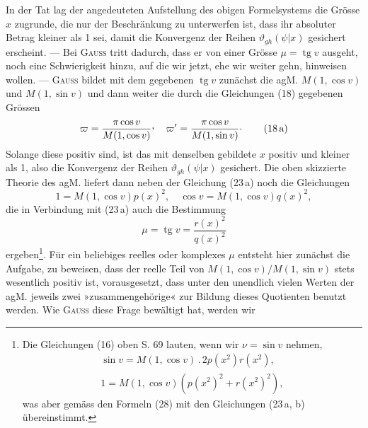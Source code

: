 In der Tat lag der angedeuteten Aufstellung des obigen Formelsystems
die Grösse \(x\) zugrunde, die nur der Beschränkung zu unterwerfen ist, dass
ihr absoluter Betrag kleiner als 1 sei, damit die Konvergenz der Reihen
\(\vartheta_{gh}(\psi|x)\) gesichert erscheint. — Bei \textsc{Gauss} tritt dadurch, dass er von einer
Grösse \(\mu=\operatorname{tg}v\) ausgeht, noch eine Schwierigkeit hinzu, auf die wir jetzt,
ehe wir weiter gehn, hinweisen wollen. — \textsc{Gauss} bildet mit dem gegebenen
\(\operatorname{tg}v\) zunächst die agM. \(M(1,\cos v)\) und \(M(1,\sin v)\) und dann weiter die durch
die Gleichungen (18) gegebenen Grössen
\begingroup\makeatletter\tagsleft@true\let\veqno\leqno\makeatother
\begin{equation*}
\varpi=\frac{\pi\cos v}{M(1,\cos v)}\mathpunct{\vcenter{\hbox{,}}}\quad
\varpi'=\frac{\pi\cos v}{M(1,\sin v)}\mathpunct{\vcenter{\hbox{.}}}\tag{18\,a}
\end{equation*}
\endgroup
\noindent Solange diese positiv sind, ist das mit denselben gebildete \(x\) positiv und kleiner
als 1, also die Konvergenz der Reihen \(\vartheta_{gh}(\psi|x)\) gesichert. Die oben skizzierte
Theorie des agM. liefert dann neben der Gleichung (23\,a) noch die Gleichungen
\begingroup\makeatletter\tagsleft@true\let\veqno\leqno\makeatother
\begin{equation*}
1=M(1,\cos v)p(x)^2,\quad\cos v=M(1,\cos v)q(x)^2,\tag{23\,b}
\end{equation*}
\endgroup
\noindent die in Verbindung mit (23\,a) auch die Bestimmung
\begingroup\makeatletter\tagsleft@true\let\veqno\leqno\makeatother
\begin{equation*}
\mu=\operatorname{tg}v=\frac{r(x)^2}{q(x)^2}\tag{23\,c}
\end{equation*}
\endgroup
\clearpage{}
\noindent ergeben\footnote{Die Gleichungen (16) oben S. 69 lauten, wenn wir \(\nu=\sin v\) nehmen,
\[
\begin{gathered}
\sin v=M(1,\cos v)\,.\,2p(x^2)r(x^2),\\
1=M(1,\cos v)(p(x^2)^2+r(x^2)^2),
\end{gathered}
\]
was aber gemäss den Formeln (28) mit den Gleichungen (23\,a, b) übereinstimmt.}.
Für ein beliebiges reelles oder komplexes \(\mu\) entsteht hier zunächst die Aufgabe, zu beweisen, dass der reelle Teil von \(M(1,\cos v)/M(1,\sin v)\)
stets wesentlich positiv ist, vorausgesetzt, dass unter den unendlich vielen
Werten der agM. jeweils zwei »zusammengehörige« zur Bildung dieses Quotienten benutzt werden. Wie \textsc{Gauss} diese Frage bewältigt hat, werden wir
